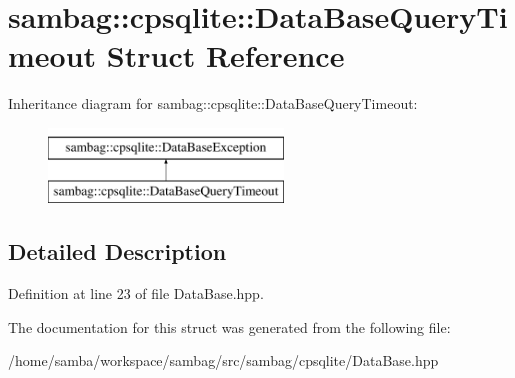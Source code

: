 \hypertarget{structsambag_1_1cpsqlite_1_1_data_base_query_timeout}{
\section{sambag::cpsqlite::DataBaseQueryTimeout Struct Reference}
\label{structsambag_1_1cpsqlite_1_1_data_base_query_timeout}
}
Inheritance diagram for sambag::cpsqlite::DataBaseQueryTimeout:\begin{figure}[H]
\begin{center}
\leavevmode
\includegraphics[height=2.000000cm]{structsambag_1_1cpsqlite_1_1_data_base_query_timeout}
\end{center}
\end{figure}


\subsection{Detailed Description}


Definition at line 23 of file DataBase.hpp.



The documentation for this struct was generated from the following file:\begin{DoxyCompactItemize}
\item 
/home/samba/workspace/sambag/src/sambag/cpsqlite/DataBase.hpp\end{DoxyCompactItemize}
